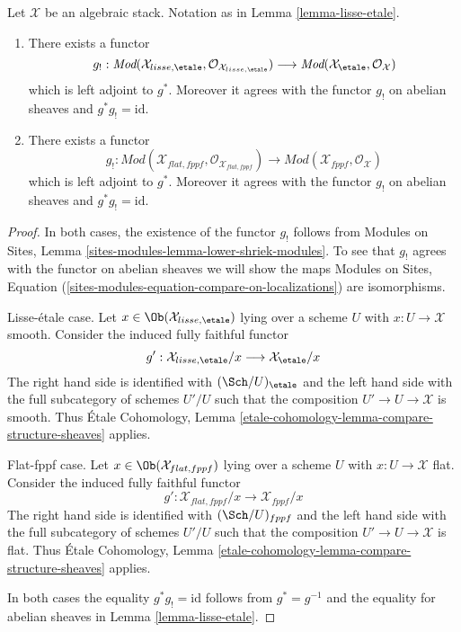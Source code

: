 \begin{lemma}
\label{lemma-lisse-etale-modules}
Let $\mathcal{X}$ be an algebraic stack. Notation as in
Lemma \ref{lemma-lisse-etale}.
\begin{enumerate}
\item There exists a functor
$$
g_! :
\textit{Mod}(\mathcal{X}_{lisse,\etale},
\mathcal{O}_{\mathcal{X}_{lisse,\etale}})
\longrightarrow
\textit{Mod}(\mathcal{X}_\etale, \mathcal{O}_{\mathcal{X}})
$$
which is left adjoint to $g^*$. Moreover it agrees with the functor $g_!$
on abelian sheaves and $g^*g_! = \text{id}$.
\item There exists a functor
$$
g_! :
\textit{Mod}(\mathcal{X}_{flat,fppf},
\mathcal{O}_{\mathcal{X}_{flat,fppf}})
\longrightarrow
\textit{Mod}(\mathcal{X}_{fppf}, \mathcal{O}_{\mathcal{X}})
$$
which is left adjoint to $g^*$. Moreover it agrees with the functor $g_!$
on abelian sheaves and $g^*g_! = \text{id}$.
\end{enumerate}
\end{lemma}

\begin{proof}
In both cases, the existence of the functor $g_!$ follows from
Modules on Sites, Lemma \ref{sites-modules-lemma-lower-shriek-modules}.
To see that $g_!$ agrees with the functor on abelian sheaves we will
show the maps Modules on Sites, Equation
(\ref{sites-modules-equation-compare-on-localizations})
are isomorphisms.

\medskip\noindent
Lisse-\'etale case. Let $x \in \Ob(\mathcal{X}_{lisse,\etale})$
lying over a scheme $U$ with $x : U \to \mathcal{X}$ smooth.
Consider the induced fully faithful functor
$$
g' :
\mathcal{X}_{lisse,\etale}/x
\longrightarrow
\mathcal{X}_\etale/x
$$
The right hand side is identified with $(\Sch/U)_\etale$ and the
left hand side with the full subcategory of schemes $U'/U$ such that
the composition $U' \to U \to \mathcal{X}$ is smooth. Thus
\'Etale Cohomology, Lemma
\ref{etale-cohomology-lemma-compare-structure-sheaves}
applies.

\medskip\noindent
Flat-fppf case. Let $x \in \Ob(\mathcal{X}_{flat,fppf})$
lying over a scheme $U$ with $x : U \to \mathcal{X}$ flat.
Consider the induced fully faithful functor
$$
g' :
\mathcal{X}_{flat,fppf}/x
\longrightarrow
\mathcal{X}_{fppf}/x
$$
The right hand side is identified with $(\Sch/U)_{fppf}$ and the
left hand side with the full subcategory of schemes $U'/U$ such that
the composition $U' \to U \to \mathcal{X}$ is flat. Thus
\'Etale Cohomology, Lemma
\ref{etale-cohomology-lemma-compare-structure-sheaves}
applies.

\medskip\noindent
In both cases the equality $g^*g_! = \text{id}$ follows from
$g^* = g^{-1}$ and the
equality for abelian sheaves in Lemma \ref{lemma-lisse-etale}.
\end{proof}

